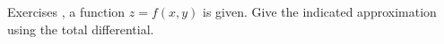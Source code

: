 {\noindent Exercises}
{, a function $z=f(x,y)$ is given. Give the indicated approximation using the total differential.}
